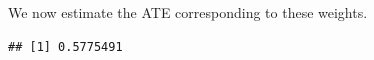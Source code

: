 \documentclass[
  ignorenonframetext,
]{beamer}
\newenvironment{Shaded}{\begin{snugshade}}{\end{snugshade}}
\newcommand{\FunctionTok}[1]{\textcolor[rgb]{0.00,0.00,0.00}{#1}}
\newcommand{\NormalTok}[1]{#1}
\newcommand{\OtherTok}[1]{\textcolor[rgb]{0.56,0.35,0.01}{#1}}
\newcommand{\SpecialCharTok}[1]{\textcolor[rgb]{0.00,0.00,0.00}{#1}}
\begin{document}
\begin{frame}[fragile]{}
\protect\hypertarget{section-18}{}
We now estimate the ATE corresponding to these weights.

\begin{Shaded}
\end{Shaded}

\begin{verbatim}
## [1] 0.5775491
\end{verbatim}
\end{frame}
\end{document}
